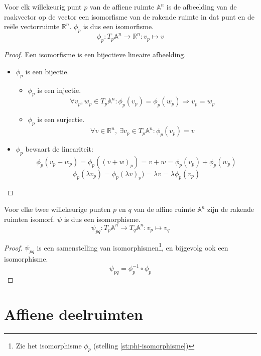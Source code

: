 \documentclass[main.tex]{subfiles}
\begin{document}
\begin{st}
  \label{st:phi- isomorfisme}
  Voor elk willekeurig punt $p$ van de affiene ruimte $\mathbb{A}^{n}$ is de afbeelding van de raakvector op de vector een isomorfisme van de rakende ruimte in dat punt en de re\"ele vectorruimte $\mathbb{R}^{n}$.
  $\phi_{p}$ is dus een  isomorfisme.
  \[ \phi_{p}: T_{p}\mathbb{A}^{n} \rightarrow \mathbb{R}^{n}: v_{p} \mapsto v \]

  \begin{proof}
    Een  isomorfisme is een bijectieve lineaire afbeelding.
    \begin{itemize}
    \item $\phi_{p}$ is een bijectie.
      \begin{itemize}
      \item $\phi_{p}$ is een injectie.
      \[ \forall v_{p},w_{p} \in T_{p}\mathbb{A}^{n}: \phi_{p}(v_{p}) = \phi_{p}(w_{p}) \Rightarrow v_{p} = w_{p}\]
      \item $\phi_{p}$ is een surjectie.
      \[ \forall v \in \mathbb{R}^{n},\ \exists v_{p} \in T_{p}\mathbb{A}^{n}: \phi_{p}(v_{p}) = v \]
      \end{itemize}
    \item $\phi_{p}$ bewaart de lineariteit:
    \[ \phi_{p}(v_{p}+w_{p}) = \phi_{p}((v+w)_{p}) = v + w = \phi_{p}(v_{p}) + \phi_{p}(w_{p}) \] 
    \[ \phi_{p}(\lambda v_{p}) = \phi_{p}(\lambda v)_{p}) = \lambda v = \lambda\phi_{p}(v_{p})\]
    \end{itemize}
  \end{proof}
\end{st}

\begin{st}
  Voor elke twee willekeurige punten $p$ en $q$ van de affine ruimte $\mathbb{A}^{n}$ zijn de rakende ruimten isomorf.
  $\psi$ is dus een isomorphisme.
  \[ \psi_{pq}: T_{p}\mathbb{A}^{n} \rightarrow T_{q}\mathbb{A}^{n}: v_{p} \mapsto v_{q}\]

  \begin{proof}
    $\psi_{pq}$ is een samenstelling van isomorphismen\footnote{Zie het isomorphisme $\phi_{p}$ (stelling \ref{st:phi-isomorphisme})}, en bijgevolg ook een isomorphisme.
    \[ \psi_{pq} = \phi_{p}^{-1} \circ\phi_{p}\]
  \end{proof}
\end{st}

\section{Affiene deelruimten}
\label{sec:affiene-deelruimten}
\end{document}

